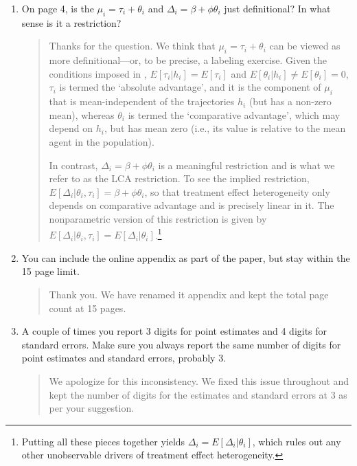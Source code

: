\documentclass{article}[11pt]
\begin{document}
\begin{enumerate}
\begin{quote}
\end{quote}
\item On page 4, is the $\mu_{i} = \tau_{i} + \theta_{i}$ and $\Delta_{i} = \beta + \phi \theta_{i}$ just definitional? In what sense is it a
restriction?
\begin{quote}
Thanks for the question. We think that $\mu_i=\tau_i+\theta_i$ can be viewed as more definitional---or, to be precise, a labeling exercise. Given the conditions imposed in \citet{S2011}, $E[\tau_i|h_i]=E[\tau_i]$ and $E[\theta_i|h_i]\neq E[\theta_i]=0$, $\tau_i$ is termed the `absolute advantage', and it is the component of $\mu_i$ that is mean-independent of the trajectories $h_i$ (but has a non-zero mean), whereas $\theta_i$ is termed the `comparative advantage', which may depend on $h_i$, but has mean zero (i.e., its value is relative to the mean agent in the population). 

In contrast, $\Delta_i=\beta+\phi\theta_i$ is a meaningful restriction and is what we refer to as the LCA restriction. To see the implied restriction,  $E[\Delta_i|\theta_i,\tau_i]=\beta+\phi\theta_i$, so that treatment effect heterogeneity only depends on comparative advantage and is precisely linear in it. The nonparametric version of this restriction is given by $E[\Delta_i|\theta_i,\tau_i]=E[\Delta_i|\theta_i]$.\footnote{Putting all these pieces together yields $\Delta_i=E[\Delta_i|\theta_i]$, which rules out any other unobservable drivers of treatment effect heterogeneity.}
\end{quote}
\item You can include the online appendix as part of the paper, but stay within the 15 page limit.
\begin{quote}
    Thank you. We have renamed it appendix and kept the total page count at 15 pages.
\end{quote}
\item A couple of times you report 3 digits for point estimates and 4 digits for standard errors. Make sure you always report the same number of digits for point estimates and standard errors, probably 3.
\begin{quote}
We apologize for this inconsistency. We fixed this issue throughout and kept the number of digits for the estimates and standard errors at 3 as per your suggestion.
\end{quote}
\end{enumerate}




\setcounter{figure}{0}
\end{document}
